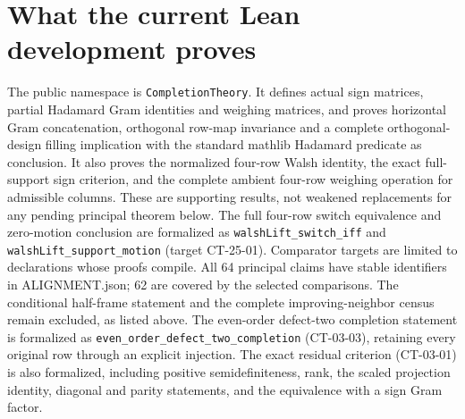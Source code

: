 \documentclass[11pt]{article}
\begin{document}
\section*{What the current Lean development proves}
The public namespace is \texttt{CompletionTheory}. It defines actual sign
matrices, partial Hadamard Gram identities and weighing matrices, and proves
horizontal Gram concatenation, orthogonal row-map invariance and a complete
orthogonal-design filling implication with the standard mathlib Hadamard
predicate as conclusion. It also proves the normalized four-row Walsh
identity, the exact full-support sign criterion, and the complete ambient
four-row weighing operation for admissible columns. These are supporting results, not
weakened replacements for any pending principal theorem below. The full
four-row switch equivalence and zero-motion conclusion are formalized as
\texttt{walshLift\_switch\_iff} and \texttt{walshLift\_support\_motion}
(target CT-25-01). Comparator
targets are limited to declarations whose proofs compile. All 64 principal claims have stable identifiers in ALIGNMENT.json; 62 are
covered by the selected comparisons. The conditional half-frame statement
and the complete improving-neighbor census remain excluded, as listed above.
The even-order defect-two completion statement is formalized as
\texttt{even\_order\_defect\_two\_completion} (CT-03-03), retaining every
original row through an explicit injection.
The exact residual criterion (CT-03-01) is also formalized, including
positive semidefiniteness, rank, the scaled projection identity, diagonal
and parity statements, and the equivalence with a sign Gram factor.






















\end{document}
